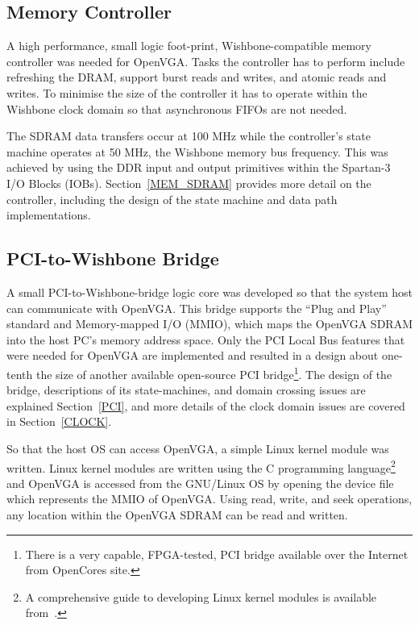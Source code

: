 \subsection{Memory Controller}
\label{OPENVGA_Mem_Ctrl}
A high performance, small logic foot-print, Wishbone-compatible memory controller
was needed for OpenVGA. Tasks the controller has to perform include refreshing
the DRAM, support burst reads and writes, and atomic reads and writes. To
minimise the size of the controller it has to operate within the Wishbone clock
domain so that asynchronous FIFOs are not needed.

The SDRAM data transfers occur at 100 MHz while the controller's state machine
operates at 50 MHz, the Wishbone memory bus frequency. This was achieved by using
the DDR input and output primitives within the Spartan-3 I/O
Blocks (IOBs).
Section~\ref{MEM_SDRAM} provides more detail on the controller, including the
design of the state machine and data path implementations.


\subsection{PCI-to-Wishbone Bridge}
\label{OPENVGA_PCI}
A small PCI-to-Wishbone-bridge logic core was developed so that the system host
can communicate with OpenVGA. This bridge supports the ``Plug and Play'' standard
and Memory-mapped I/O (MMIO), which maps the OpenVGA SDRAM into the host PC's memory
address space. Only the PCI Local Bus features that were needed for OpenVGA are
implemented and resulted in a design about one-tenth the size of another
available open-source PCI bridge\footnote{There is a very capable, FPGA-tested,
PCI bridge available over the Internet from OpenCores site.}. The design of the
bridge, descriptions of its state-machines, and domain crossing issues are
explained Section~\ref{PCI}, and more details of the clock domain issues are
covered in Section~\ref{CLOCK}.

So that the host OS can access OpenVGA, a simple Linux kernel module was written.
Linux kernel modules are written using the C programming language\footnote{A
comprehensive guide to developing Linux kernel modules is available
from~\cite{salzman:lkm}.} and OpenVGA is accessed from the GNU/Linux OS by
opening the device file which represents the MMIO of OpenVGA. Using read, write,
and seek operations, any location within the OpenVGA SDRAM can be read and
written.



